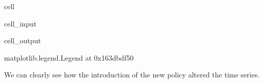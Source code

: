 \documentclass[letterpaper,10pt,english]{jupyterBook}
\begin{document}
\begin{sphinxuseclass}{cell}\begin{sphinxVerbatimInput}

\begin{sphinxuseclass}{cell_input}
\begin{sphinxVerbatim}[commandchars=\\\{\}]
   \PYG{p}{[}\PYG{p}{]}
     \PYG{p}{[} \PYG{p}{]} 
   
\end{sphinxVerbatim}

\end{sphinxuseclass}\end{sphinxVerbatimInput}
\begin{sphinxVerbatimOutput}

\begin{sphinxuseclass}{cell_output}
\begin{sphinxVerbatim}[commandchars=\\\{\}]
\PYGZlt{}matplotlib.legend.Legend at 0x163dbdf50\PYGZgt{}
\end{sphinxVerbatim}

\noindent{}

\end{sphinxuseclass}\end{sphinxVerbatimOutput}

\end{sphinxuseclass}
\sphinxAtStartPar
We can clearly see how the introduction of the new policy altered the time series.
\end{document}
